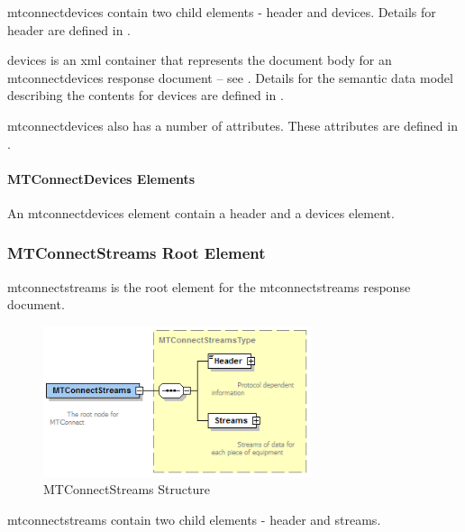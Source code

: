 \FloatBarrier

\gls{mtconnectdevices} \MUST contain two \glspl{child element} - \gls{header} and \gls{devices}.  Details for \gls{header} are defined in .  

\gls{devices} is an \gls{xml} container that represents the \gls{document body} for an \gls{mtconnectdevices response document} -- see .  Details for the \gls{semantic data model} describing the contents for \gls{devices} are defined in .

\gls{mtconnectdevices} also has a number of attributes.  These attributes are defined in .

\paragraph{MTConnectDevices Elements}\mbox{}

An \gls{mtconnectdevices} element \MUST contain a \gls{header} and a \gls{devices} element.



\subsubsection{MTConnectStreams Root Element}

\gls{mtconnectstreams} is the \gls{root element} for the \gls{mtconnectstreams response document}.  

\begin{figure}[ht]
  \centering
  \includegraphics[width=0.7\textwidth]{figures/mtconnectstreams-structure.png}
  \caption{MTConnectStreams Structure}
  \label{fig:mtconnectstreams-structure}
\end{figure}

\FloatBarrier

\gls{mtconnectstreams} \MUST contain two \glspl{child element} - \gls{header} and \gls{streams}.  

